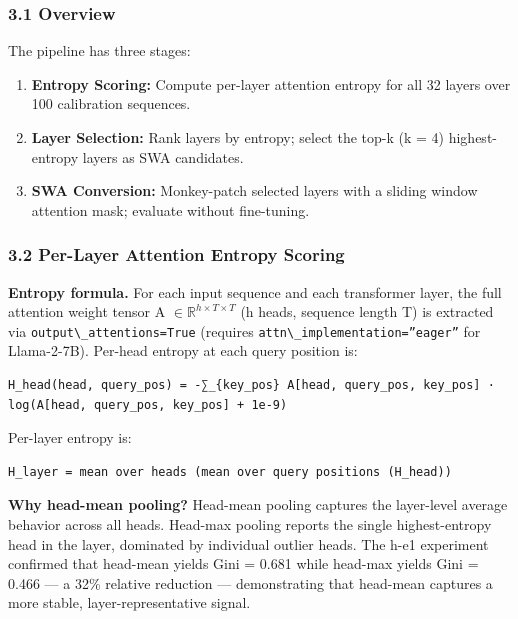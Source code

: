 
\subsubsection{3.1 Overview}

The pipeline has three stages:

\begin{enumerate}
\item \textbf{Entropy Scoring:} Compute per-layer attention entropy for all 32 layers over 100 calibration sequences.
\item \textbf{Layer Selection:} Rank layers by entropy; select the top-k (k = 4) highest-entropy layers as SWA candidates.
\item \textbf{SWA Conversion:} Monkey-patch selected layers with a sliding window attention mask; evaluate without fine-tuning.
\end{enumerate}

\subsubsection{3.2 Per-Layer Attention Entropy Scoring}

\textbf{Entropy formula.} For each input sequence and each transformer layer, the full attention weight tensor A $\in \mathbb{R}^{h \times T \times T}$ (h heads, sequence length T) is extracted via \texttt{output\textbackslash \_attentions=True} (requires \texttt{attn\textbackslash \_implementation=''eager''} for Llama-2-7B). Per-head entropy at each query position is:

\begin{verbatim}
H_head(head, query_pos) = -∑_{key_pos} A[head, query_pos, key_pos] · log(A[head, query_pos, key_pos] + 1e-9)
\end{verbatim}

Per-layer entropy is:

\begin{verbatim}
H_layer = mean over heads (mean over query positions (H_head))
\end{verbatim}

\textbf{Why head-mean pooling?} Head-mean pooling captures the layer-level average behavior across all heads. Head-max pooling reports the single highest-entropy head in the layer, dominated by individual outlier heads. The h-e1 experiment confirmed that head-mean yields Gini = 0.681 while head-max yields Gini = 0.466 --- a 32\% relative reduction --- demonstrating that head-mean captures a more stable, layer-representative signal.

